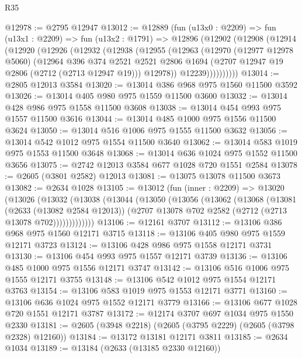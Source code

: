 \begin{lexlean}{R35}
\begin{coremodule}
@12978 := @2795 @12947
@13012 := @12889
    (fun (u13x0 : @2209) =>
    fun (u13x1 : @2209) =>
    fun (u13x2 : @1791) =>
    @12896
      (@12902
        (@12908
          (@12914
            (@12920
              (@12926
                (@12932
                  (@12938
                    (@12955
                      (@12963
                        (@12970
                          (@12977 @12978 @5060)
                          (@12964
                            @396
                            @374
                            @2521
                            @2521
                            @2806
                            @1694
                            (@2707 @12947 @19 @2806 (@2712 (@2713 @12947 @19)))
                            @12978))
                        @12239))))))))))
@13014 := @2805 @12013 @3584
@13020 := @13014 @386 @968 @975 @1560 @11500 @3592
@13026 := @13014 @405 @980 @975 @1559 @11500 @3600
@13032 := @13014 @428 @986 @975 @1558 @11500 @3608
@13038 := @13014 @454 @993 @975 @1557 @11500 @3616
@13044 := @13014 @485 @1000 @975 @1556 @11500 @3624
@13050 := @13014 @516 @1006 @975 @1555 @11500 @3632
@13056 := @13014 @542 @1012 @975 @1554 @11500 @3640
@13062 := @13014 @583 @1019 @975 @1553 @11500 @3648
@13068 := @13014 @636 @1024 @975 @1552 @11500 @3656
@13075 := @2742 @12013 @3584 @677 @1028 @720 @1551 @2584
@13078 := @2605 (@3801 @2582) @12013
@13081 := @13075 @13078 @11500 @3673
@13082 := @2634 @1028
@13105 := @13012
    (fun (inner : @2209) =>
    @13020
      (@13026
        (@13032
          (@13038
            (@13044
              (@13050
                (@13056
                  (@13062
                    (@13068
                      (@13081
                        (@2633 (@13082 @2584 @12013))
                        (@2707 @13078 @702 @2582 (@2712 (@2713 @13078 @702)))))))))))))
@13106 := @12161 @3707
@13112 := @13106 @386 @968 @975 @1560 @12171 @3715
@13118 := @13106 @405 @980 @975 @1559 @12171 @3723
@13124 := @13106 @428 @986 @975 @1558 @12171 @3731
@13130 := @13106 @454 @993 @975 @1557 @12171 @3739
@13136 := @13106 @485 @1000 @975 @1556 @12171 @3747
@13142 := @13106 @516 @1006 @975 @1555 @12171 @3755
@13148 := @13106 @542 @1012 @975 @1554 @12171 @3763
@13154 := @13106 @583 @1019 @975 @1553 @12171 @3771
@13160 := @13106 @636 @1024 @975 @1552 @12171 @3779
@13166 := @13106 @677 @1028 @720 @1551 @12171 @3787
@13172 := @12174 @3707 @697 @1034 @975 @1550 @2330
@13181 := @2605 (@3948 @2218) (@2605 (@3795 @2229) (@2605 (@3798 @2328) @12160))
@13184 := @13172 @13181 @12171 @3811
@13185 := @2634 @1034
@13189 := @13184 (@2633 (@13185 @2330 @12160))

\end{coremodule}
\end{lexlean}
